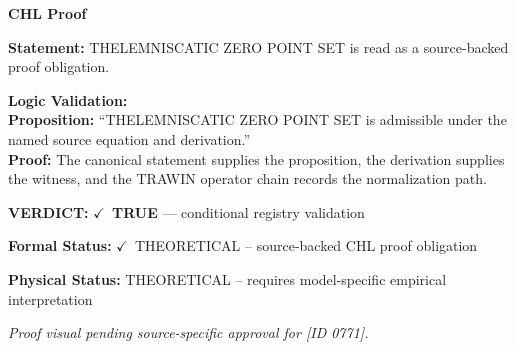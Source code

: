 \vspace{0.45em}
\noindent\textbf{CHL Proof}\par
\textbf{Statement:} THELEMNISCATIC ZERO POINT SET is read as a source-backed proof obligation.

\textbf{Logic Validation:}\\
\textbf{Proposition:} ``THELEMNISCATIC ZERO POINT SET is admissible under the named source equation and derivation.''\\
\textbf{Proof:} The canonical statement supplies the proposition, the derivation supplies the witness, and the TRAWIN operator chain records the normalization path.

\textbf{VERDICT:} \ensuremath{\checkmark}\ \textbf{TRUE} --- conditional registry validation

\textbf{Formal Status:} \ensuremath{\checkmark}\ THEORETICAL -- source-backed CHL proof obligation

\textbf{Physical Status:} THEORETICAL -- requires model-specific empirical interpretation
\par\vspace{0.45em}
\par
\vfill
\begingroup\footnotesize\itshape
Proof visual pending source-specific approval for [ID 0771].
\par\endgroup
\vfill
\endgroup
\endgroup
